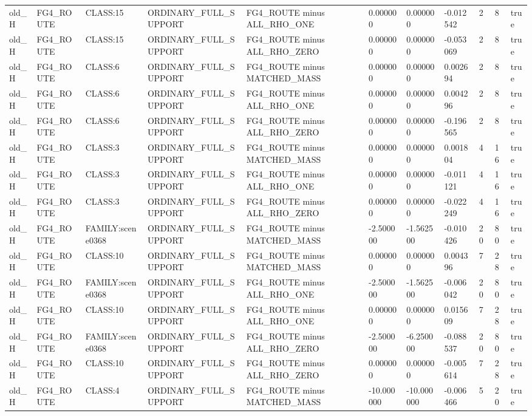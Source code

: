 \begin{tabular}{lllllllllll}
old\_H & FG4\_ROUTE & CLASS:15 & ORDINARY\_FULL\_SUPPORT & FG4\_ROUTE minus ALL\_RHO\_ONE & 0.000000 & 0.000000 & -0.012542 & 2 & 8 & true \\
old\_H & FG4\_ROUTE & CLASS:15 & ORDINARY\_FULL\_SUPPORT & FG4\_ROUTE minus ALL\_RHO\_ZERO & 0.000000 & 0.000000 & -0.053069 & 2 & 8 & true \\
old\_H & FG4\_ROUTE & CLASS:6 & ORDINARY\_FULL\_SUPPORT & FG4\_ROUTE minus MATCHED\_MASS & 0.000000 & 0.000000 & 0.002694 & 2 & 8 & true \\
old\_H & FG4\_ROUTE & CLASS:6 & ORDINARY\_FULL\_SUPPORT & FG4\_ROUTE minus ALL\_RHO\_ONE & 0.000000 & 0.000000 & 0.004296 & 2 & 8 & true \\
old\_H & FG4\_ROUTE & CLASS:6 & ORDINARY\_FULL\_SUPPORT & FG4\_ROUTE minus ALL\_RHO\_ZERO & 0.000000 & 0.000000 & -0.196565 & 2 & 8 & true \\
old\_H & FG4\_ROUTE & CLASS:3 & ORDINARY\_FULL\_SUPPORT & FG4\_ROUTE minus MATCHED\_MASS & 0.000000 & 0.000000 & 0.001804 & 4 & 16 & true \\
old\_H & FG4\_ROUTE & CLASS:3 & ORDINARY\_FULL\_SUPPORT & FG4\_ROUTE minus ALL\_RHO\_ONE & 0.000000 & 0.000000 & -0.011121 & 4 & 16 & true \\
old\_H & FG4\_ROUTE & CLASS:3 & ORDINARY\_FULL\_SUPPORT & FG4\_ROUTE minus ALL\_RHO\_ZERO & 0.000000 & 0.000000 & -0.022249 & 4 & 16 & true \\
old\_H & FG4\_ROUTE & FAMILY:scene0368 & ORDINARY\_FULL\_SUPPORT & FG4\_ROUTE minus MATCHED\_MASS & -2.500000 & -1.562500 & -0.010426 & 20 & 80 & true \\
old\_H & FG4\_ROUTE & CLASS:10 & ORDINARY\_FULL\_SUPPORT & FG4\_ROUTE minus MATCHED\_MASS & 0.000000 & 0.000000 & 0.004396 & 7 & 28 & true \\
old\_H & FG4\_ROUTE & FAMILY:scene0368 & ORDINARY\_FULL\_SUPPORT & FG4\_ROUTE minus ALL\_RHO\_ONE & -2.500000 & -1.562500 & -0.006042 & 20 & 80 & true \\
old\_H & FG4\_ROUTE & CLASS:10 & ORDINARY\_FULL\_SUPPORT & FG4\_ROUTE minus ALL\_RHO\_ONE & 0.000000 & 0.000000 & 0.015609 & 7 & 28 & true \\
old\_H & FG4\_ROUTE & FAMILY:scene0368 & ORDINARY\_FULL\_SUPPORT & FG4\_ROUTE minus ALL\_RHO\_ZERO & -2.500000 & -6.250000 & -0.088537 & 20 & 80 & true \\
old\_H & FG4\_ROUTE & CLASS:10 & ORDINARY\_FULL\_SUPPORT & FG4\_ROUTE minus ALL\_RHO\_ZERO & 0.000000 & 0.000000 & -0.005614 & 7 & 28 & true \\
old\_H & FG4\_ROUTE & CLASS:4 & ORDINARY\_FULL\_SUPPORT & FG4\_ROUTE minus MATCHED\_MASS & -10.000000 & -10.000000 & -0.006466 & 5 & 20 & true \\

\end{tabular}
